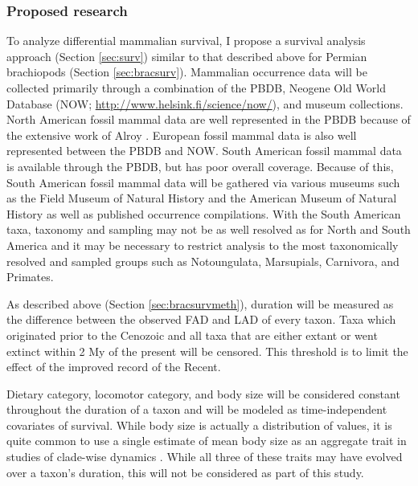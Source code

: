 \documentclass[12pt,letterpaper]{article}
\begin{document}
\subsubsection{Proposed research} \label{sec:mamsurvmeth}
To analyze differential mammalian survival, I propose a survival analysis approach (Section \ref{sec:surv}) similar to that described above for Permian brachiopods (Section \ref{sec:bracsurv}).  Mammalian occurrence data will be collected primarily through a combination of the PBDB, Neogene Old World Database (NOW; \url{http://www.helsink.fi/science/now/}), and museum collections. North American fossil mammal data are well represented in the PBDB because of the extensive work of Alroy \citep{Alroy1996a,Alroy1998,Alroy2000g}. European fossil mammal data is also well represented between the PBDB and NOW. South American fossil mammal data is available through the PBDB, but has poor overall coverage. Because of this, South American fossil mammal data will be gathered via various museums such as the Field Museum of Natural History and the American Museum of Natural History as well as published occurrence compilations. With the South American taxa, taxonomy and sampling may not be as well resolved as for North and South America and it may be necessary to restrict analysis to the most taxonomically resolved and sampled groups such as Notoungulata, Marsupials, Carnivora, and Primates.

As described above (Section \ref{sec:bracsurvmeth}), duration will be measured as the difference between the observed FAD and LAD of every taxon. Taxa which originated prior to the Cenozoic and all taxa that are either extant or went extinct within 2 My of the present will be censored. This threshold is to limit the effect of the improved record of the Recent.

Dietary category, locomotor category, and body size will be considered constant throughout the duration of a taxon and will be modeled as time-independent covariates of survival. While body size is actually a distribution of values, it is quite common to use a single estimate of mean body size as an aggregate trait in studies of clade-wise dynamics \citep{Jablonski2008a}. While all three of these traits may have evolved over a taxon's duration, this will not be considered as part of this study.
\end{document}
